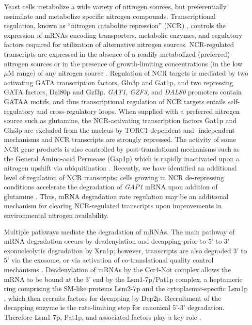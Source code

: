 Yeast cells metabolize a wide variety of nitrogen sources, but
preferentially assimilate and metabolize specific nitrogen compounds.
Transcriptional regulation, known as
“nitrogen catabolite repression” (NCR)
\parencite{magasanik2002nitrogen},
controls the expression of mRNAs
encoding transporters, metabolic enzymes, and regulatory
factors required for utilization of alternative nitrogen sources. 
NCR-regulated transcripts are expressed in the
absence of a readily metabolized (preferred) nitrogen sources or in
the presence of growth-limiting concentrations (in the low $\mu$M range)
of any nitrogen source \parencite{godard2007effect,airoldi2016steady}. Regulation
of NCR targets is mediated by two activating GATA
transcription factors, Gln3p and Gat1p, and two repressing
GATA factors, Dal80p and Gzf3p. \textit{GAT1}, \textit{GZF3}, and
\textit{DAL80} promoters
contain GATAA motifs, and thus transcriptional regulation of NCR
targets entails self-regulatory and cross-regulatory loops. When
supplied with a preferred nitrogen source such as glutamine, the
NCR-activating transcription factors Gat1p and Gln3p are excluded from
the nucleus by TORC1-dependent and -independent mechanisms
\parencite{beck1999tor,tate2013five,tate2017general} and NCR transcripts are strongly
repressed. The activity of some NCR gene
products is also controlled by post-translational mechanisms
\parencite{cooper1983function} such as the General Amino-acid Permease
(Gap1p) which is rapidly inactivated upon a nitrogen 
upshift via ubiquitination
\parencite{stanbrough1995transcriptional,risinger2006activity,merhi2012internal}. Recently, we have
identified an additional level of regulation of NCR transcripts: cells
growing in NCR de-repressing conditions accelerate the degradation
of \textit{GAP1} %
mRNA upon addition of glutamine
\parencite{airoldi2016steady}. Thus, mRNA degradation rate regulation may be an
additional mechanism for clearing NCR-regulated transcripts upon 
improvements in environmental nitrogen availability.

Multiple pathways mediate the degradation of mRNAs. The main pathway
of mRNA degradation occurs by deadenylation and decapping
prior to 5’ to 3’ exonucleolytic degradation by Xrn1p; however,
transcripts are also degraded 3’ to 5’ via the exosome, or via
activation of co-translational quality control mechanisms
\parencite{parker2012rna}. Deadenylation of mRNAs by the Ccr4-Not complex
allows the mRNA to be bound at the 3' end by the 
Lsm1-7p/Pat1p complex, a heptameric
ring comprising the SM-like proteins Lsm2-7p and the
cytoplasmic-specific Lsm1p
\parencite{tharun2000yeast,sharif2013architecture}, which then
recruits factors for decapping by Dcp2p. 
Recruitment of the decapping enzyme \parencite{coller2004eukaryotic} is the 
rate-limiting step for canonical 5'-3' degradation.
Therefore Lsm1-7p, Pat1p,
and associated factors play a key role \parencite{nissan2010decapping}. 

